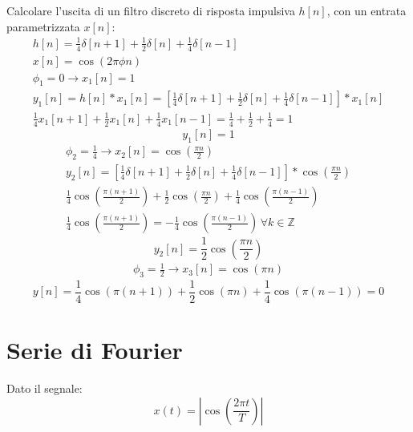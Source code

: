 \documentclass{article}
\begin{document}
Calcolare l'uscita di un filtro discreto di risposta impulsiva $h[n]$, con un entrata parametrizzata $x[n]$:
\begin{gather*}
    h[n]=\displaystyle\frac{1}{4}\delta[n+1]+\frac{1}{2}\delta[n]+\frac{1}{4}\delta[n-1]\\
    x[n]=\cos(2\pi\phi n)\\
    \phi_1=0\to x_1[n]=1\\
    y_1[n]=h[n]*x_1[n]=\displaystyle\left[\frac{1}{4}\delta[n+1]+\frac{1}{2}\delta[n]+\frac{1}{4}\delta[n-1]\right]*x_1[n]\\
    \displaystyle\frac{1}{4}x_1[n+1]+\frac{1}{2}x_1[n]+\frac{1}{4}x_1[n-1]=\frac{1}{4}+\frac{1}{2}+\frac{1}{4}=1
\end{gather*}
\begin{equation}
    y_1[n]=1
\end{equation}
\begin{gather*}
    \phi_2=\displaystyle\frac{1}{4}\to x_2[n]=\cos\left(\displaystyle\frac{\pi n}{2}\right)\\
    y_2[n]=\left[\displaystyle\frac{1}{4}\delta[n+1]+\frac{1}{2}\delta[n]+\frac{1}{4}\delta[n-1]\right]*\cos\left(\frac{\pi n}{2}\right)\\
    \displaystyle\frac{1}{4}\cos\left(\frac{\pi (n+1)}{2}\right)+\frac{1}{2}\cos\left(\frac{\pi n}{2}\right)+\frac{1}{4}\cos\left(\frac{\pi (n-1)}{2}\right)\\
    \displaystyle\frac{1}{4}\cos\left(\frac{\pi (n+1)}{2}\right)=-\frac{1}{4}\cos\left(\frac{\pi (n-1)}{2}\right)\,\forall k\in\mathbb{Z}
\end{gather*}
\begin{equation}
    y_2[n]=\displaystyle\frac{1}{2}\cos\left(\frac{\pi n}{2}\right)
\end{equation}
\begin{gather*}
    \phi_3=\displaystyle\frac{1}{2}\to x_3[n]=\cos\left(\displaystyle{\pi n}\right)
\end{gather*}
\begin{equation}
    y[n]=\displaystyle\frac{1}{4}\cos(\pi (n+1))+\frac{1}{2}\cos(\pi n)+\frac{1}{4}\cos(\pi(n-1))=0
\end{equation}

\clearpage

\section{Serie di Fourier}

Dato il segnale:
\begin{equation*}
    x(t)=\left|\cos\left(\displaystyle\frac{2\pi t}{T}\right)\right|
\end{equation*}
\end{document}
